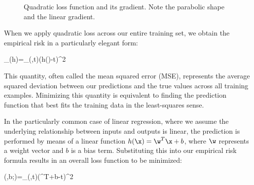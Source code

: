 \begin{figure}[ht]
\begin{center}
\end{center}
\caption{Quadratic loss function and its gradient. Note the parabolic shape and the linear gradient.}
\end{figure}

\medskip

When we apply quadratic loss across our entire training set, we obtain the empirical risk in a particularly elegant form:
\begin{myequation}
	_{}(h)=\sum_{(\x,t)\in{}}(h(\x)-t)^2
\end{myequation}

This quantity, often called the \alert{mean squared error} (MSE), represents the average squared deviation between our predictions and the true values across all training examples. Minimizing this quantity is equivalent to finding the prediction function that best fits the training data in the least-squares sense.

\medskip

In the particularly common case of \alert{linear regression}, where we assume the underlying relationship between inputs and outputs is linear, the prediction is performed by means of a linear function $h(\x)=\w^T\x+b$, where $\w$ represents a weight vector and $b$ is a bias term. Substituting this into our empirical risk formula results in an overall loss function to be minimized:
\begin{myequation}
	(\w,b;)=\sum_{(\x,t)\in{}}(\w^T\x+b-t)^2
\end{myequation}

